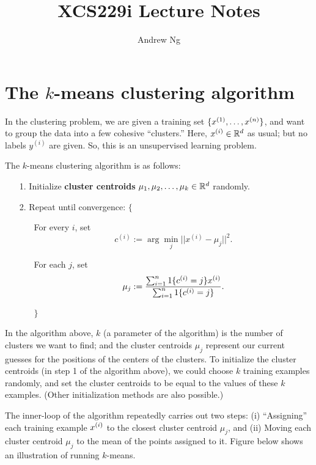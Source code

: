 \documentclass{article}
\begin{document}
\title{XCS229i Lecture Notes}
\author{Andrew Ng}
\date{}
\maketitle




\section*{The $k$-means clustering algorithm} 

In the clustering problem, we are given a training set $\{x^{(1)}, \ldots, x^{({n})}\}$,
and want to group the data into a few cohesive ``clusters.''  
Here, $x^{(i)} \in {\mathbb R}^{d}$ as usual; but 
no labels $y^{(i)}$ are given. So, this is an unsupervised learning problem.

The $k$-means clustering algorithm is as follows:
\begin{itemize}
\item[1.] Initialize {\bf cluster centroids} $\mu_1, \mu_2, \ldots, \mu_k \in {\mathbb R}^{d}$ randomly.
\item[2.] Repeat until convergence: $\{$
\begin{itemize}
\item[] For every $i$, set 
\[
c^{(i)} := \arg \min_j ||x^{(i)} - \mu_j||^2.
\]
\item[] For each $j$, set 
\[
\mu_j := \frac{\sum_{i=1}^{n} 1\{c^{(i)}=j\} x^{(i)}}{\sum_{i=1}^{n} 1\{c^{(i)}=j\}}. 
\]
\item[] $\}$
\end{itemize}
\end{itemize}

In the algorithm above, $k$ (a parameter of the algorithm) is the number of
clusters we want to find; and the cluster centroids $\mu_j$ represent our
current guesses for the positions of the centers of the clusters.  To initialize the
cluster centroids (in step 1 of the algorithm above), we could choose $k$ training 
examples randomly, and set the cluster centroids to be equal to the values of 
these $k$ examples.  (Other initialization methods are also possible.) 

The inner-loop of the algorithm repeatedly carries out two steps: (i)
``Assigning'' each training example ${x^{(i)}}$ to the closest cluster centroid
$\mu_j$, and (ii) Moving each cluster centroid $\mu_j$ to the mean of the
points assigned to it.  Figure below shows an illustration of
running $k$-means.
\end{document}
